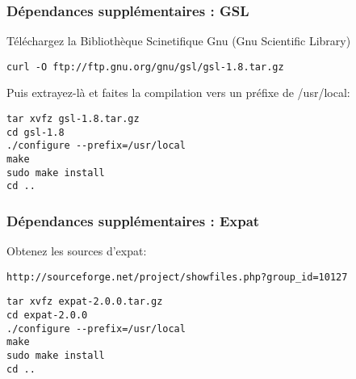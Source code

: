 \subsubsection{Dépendances supplémentaires : GSL}
Téléchargez la Bibliothèque Scinetifique Gnu (Gnu Scientific Library)

\begin{verbatim}
curl -O ftp://ftp.gnu.org/gnu/gsl/gsl-1.8.tar.gz 
\end{verbatim}

Puis extrayez-là et faites la compilation vers un préfixe de /usr/local:

\begin{verbatim}
tar xvfz gsl-1.8.tar.gz 
cd gsl-1.8 
./configure --prefix=/usr/local 
make
sudo make install
cd ..  
\end{verbatim}

% 
% 

\subsubsection{Dépendances supplémentaires : Expat}
Obtenez les sources d'expat:

\begin{verbatim}
http://sourceforge.net/project/showfiles.php?group_id=10127 
\end{verbatim}

\begin{verbatim}
tar xvfz expat-2.0.0.tar.gz 
cd expat-2.0.0 
./configure --prefix=/usr/local
make 
sudo make install 
cd ..  
\end{verbatim}

